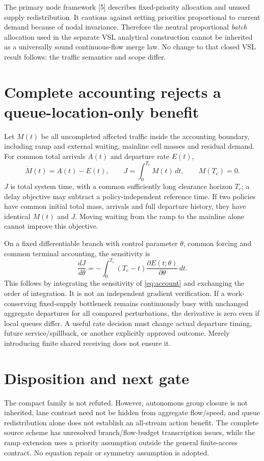\documentclass[10pt,a4paper]{article}
\begin{document}
The primary node framework [5] describes fixed-priority allocation and unused
supply redistribution. It cautions against setting priorities proportional to
current demand because of nodal invariance. Therefore the neutral proportional
\emph{batch} allocation used in the separate VSL analytical construction cannot
be inherited as a universally sound continuous-flow merge law. No change to that
closed VSL result follows: the traffic semantics and scope differ.

\section{Complete accounting rejects a queue-location-only benefit}
Let $M(t)$ be all uncompleted affected traffic inside the accounting boundary,
including ramp and external waiting, mainline cell masses and residual demand.
For common total arrivals $A(t)$ and departure rate $E(t)$,
\begin{equation}
 \dot M(t)=A(t)-E(t),\qquad
 J=\int_0^{T_c}M(t)\,dt,\qquad M(T_c)=0. \label{eq:account}
\end{equation}
$J$ is total system time, with a common sufficiently long clearance horizon
$T_c$; a delay objective may subtract a policy-independent reference time.
If two policies have common initial total mass, arrivals and full departure
history, they have identical $M(t)$ and $J$. Moving waiting from the ramp to
the mainline alone cannot improve this objective.

On a fixed differentiable branch with control parameter $\theta$, common forcing
and common terminal accounting, the sensitivity is
\begin{equation}
 \frac{dJ}{d\theta}
 =-\int_0^{T_c}(T_c-t)\frac{\partial E(t;\theta)}{\partial\theta}\,dt.
 \label{eq:grad}
\end{equation}
This follows by integrating the sensitivity of \eqref{eq:account} and exchanging
the order of integration. It is not an independent gradient verification.
If a work-conserving fixed-supply bottleneck remains continuously busy with
unchanged aggregate departures for all compared perturbations, the derivative
is zero even if local queues differ. A useful rate decision must change actual
departure timing, future service/spillback, or another explicitly approved
outcome. Merely introducing finite shared receiving does not ensure it.

\section{Disposition and next gate}
The compact family is not refuted. However, autonomous group closure is not
inherited, lane contrast need not be hidden from aggregate flow/speed, and queue
redistribution alone does not establish an all-stream action benefit.
The complete source scheme has unresolved branch/flow-budget transcription
issues, while the ramp extension uses a priority assumption outside the general
finite-access contract. No equation repair or symmetry assumption is adopted.
\end{document}
